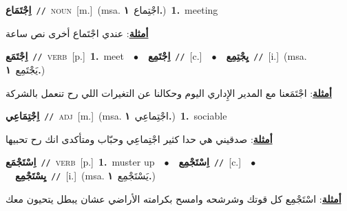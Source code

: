 \documentclass[10pt,a4paper,twoside]{article} %
\begin{document}
\begin{multicols}{2}
{\setlength\topsep{0pt}\textbf{\foreignlanguage{arabic}{اِجْتَمَاع}}\ {\color{gray}\texttt{//}\color{black}}\ \textsc{noun}\ [m.]\ \color{gray}(msa. \foreignlanguage{arabic}{اجْتِماع}~\foreignlanguage{arabic}{\textbf{١.}})\color{black}\ \textbf{1.}~meeting\  \begin{flushright}\color{gray}\foreignlanguage{arabic}{\textbf{\underline{\foreignlanguage{arabic}{أمثلة}}}: عندي اجْتَماع أخرى نص ساعة}\end{flushright}\color{black}} \vspace{2mm}

{\setlength\topsep{0pt}\textbf{\foreignlanguage{arabic}{اِجْتَمَع}}\ {\color{gray}\texttt{//}\color{black}}\ \textsc{verb}\ [p.]\ \textbf{1.}~meet\ \ $\bullet$\ \ \setlength\topsep{0pt}\textbf{\foreignlanguage{arabic}{اِجْتَمِع}}\ {\color{gray}\texttt{//}\color{black}}\ [c.]\ \ $\bullet$\ \ \setlength\topsep{0pt}\textbf{\foreignlanguage{arabic}{يِجْتِمِع}}\ {\color{gray}\texttt{//}\color{black}}\ [i.]\ \color{gray}(msa. \foreignlanguage{arabic}{يَجْتَمِع}~\foreignlanguage{arabic}{\textbf{١.}})\color{black}\  \begin{flushright}\color{gray}\foreignlanguage{arabic}{\textbf{\underline{\foreignlanguage{arabic}{أمثلة}}}: اجْتَمَعنا مع المدير الإِداري اليوم وحكالنا عن التغيرات اللي رح تنعمل بالشركة}\end{flushright}\color{black}} \vspace{2mm}

{\setlength\topsep{0pt}\textbf{\foreignlanguage{arabic}{اِجْتِمَاعِي}}\ {\color{gray}\texttt{//}\color{black}}\ \textsc{adj}\ [m.]\ \color{gray}(msa. \foreignlanguage{arabic}{اجْتِماعِي}~\foreignlanguage{arabic}{\textbf{١.}})\color{black}\ \textbf{1.}~sociable\  \begin{flushright}\color{gray}\foreignlanguage{arabic}{\textbf{\underline{\foreignlanguage{arabic}{أمثلة}}}: صدقيني هي حدا كثير اجْتِماعِي وحبّاب ومتأكدى انك رح تحبيها}\end{flushright}\color{black}} \vspace{2mm}

{\setlength\topsep{0pt}\textbf{\foreignlanguage{arabic}{اِسْتَجْمَع}}\ {\color{gray}\texttt{//}\color{black}}\ \textsc{verb}\ [p.]\ \textbf{1.}~muster up\ \ $\bullet$\ \ \setlength\topsep{0pt}\textbf{\foreignlanguage{arabic}{اِسْتَجْمِع}}\ {\color{gray}\texttt{//}\color{black}}\ [c.]\ \ $\bullet$\ \ \setlength\topsep{0pt}\textbf{\foreignlanguage{arabic}{يِسْتَجْمِع}}\ {\color{gray}\texttt{//}\color{black}}\ [i.]\ \color{gray}(msa. \foreignlanguage{arabic}{يَسْتَجْمِع}~\foreignlanguage{arabic}{\textbf{١.}})\color{black}\  \begin{flushright}\color{gray}\foreignlanguage{arabic}{\textbf{\underline{\foreignlanguage{arabic}{أمثلة}}}: اسْتَجْمِع كل قوتك وشرشحه وامسح بكرامته الأراضي عشان يبطل يتحيون معك}\end{flushright}\color{black}} \vspace{2mm}


\end{multicols}
\end{document}
